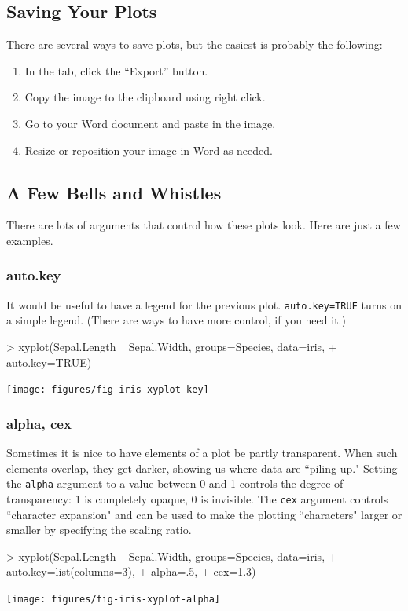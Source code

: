 \subsection{Saving Your Plots}

There are several ways to save plots, but the easiest is probably the following:
\begin{enumerate}
\item
In the  tab, click the ``Export'' button.
\item
Copy the image to the clipboard using right click.
\item
Go to your Word document and paste in the image.
\item
Resize or reposition your image in Word as needed.
\end{enumerate}

\subsection{A Few Bells and Whistles}
There are lots of arguments that control how these plots look.  Here are just a few examples.

\subsubsection{auto.key}
It would be useful to have a legend for the previous plot.   \verb!auto.key=TRUE! 
turns on a simple legend.  (There are ways to have more control, if you need it.)
\begin{center}
\begin{Schunk}
\begin{Sinput}
> xyplot(Sepal.Length ~ Sepal.Width, groups=Species, data=iris, 
+ 	auto.key=TRUE)   
\end{Sinput}
\end{Schunk}
\texttt{[image: figures/fig-iris-xyplot-key]}
\end{center}

\subsubsection{alpha, cex}
Sometimes it is nice to have elements of a plot be partly transparent.  When such
elements overlap, they get darker, showing us where data are ``piling up."
Setting the \verb!alpha! argument to a value between 0 and 1 controls the degree 
of transparency: 1 is completely opaque, 0 is invisible.
The \verb!cex! argument controls ``character expansion" and can be used to make the 
plotting ``characters" larger or smaller by specifying the scaling ratio.
\begin{center}
\begin{Schunk}
\begin{Sinput}
> xyplot(Sepal.Length ~ Sepal.Width, groups=Species, data=iris, 
+ 	auto.key=list(columns=3),
+ 	alpha=.5,
+ 	cex=1.3)   
\end{Sinput}
\end{Schunk}
\texttt{[image: figures/fig-iris-xyplot-alpha]}
\end{center}


